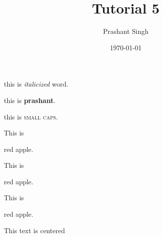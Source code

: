 \documentclass[11pt]{article}
\begin{document}
	\title{Tutorial 5}
	\author{Prashant Singh}
	\date{\today}
	\maketitle
	this is \textit{italicized} word.
	
	this is \textbf{prashant}.
	
	this is \textsc{small caps}.
	
	This is \begin{Large}red apple.\end{Large}
	
	This is \begin{huge}red apple.\end{huge}
	
	This is \begin{Huge}red apple.\end{Huge}
	
	\begin{center} This text is centered \end{center}
\end{document}
